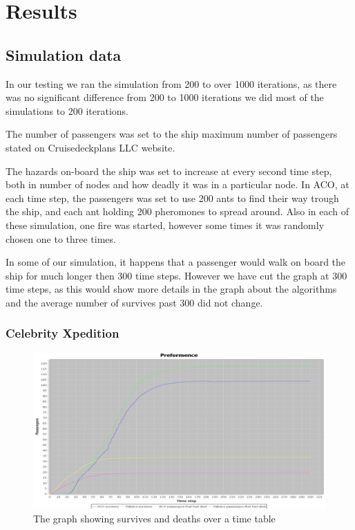 \chapter{Results}
\label{ch:testing}

\section{Simulation data}
In our testing we ran the simulation from 200 to over 1000 iterations, as there was no significant difference from 200 to 1000 iterations we did most of the simulations to 200 iterations.

The number of passengers was set to the ship maximum number of passengers stated on Cruisedeckplans LLC\cite{cruseships} website.

The hazards on-board the ship was set to increase at every second time step, both in number of nodes and how deadly it was in a particular node. In ACO, at each time step, the passengers was set to use 200 ants to find their way trough the ship, and each ant holding 200 pheromones to spread around. Also in each of these simulation, one fire was started, however some times it was randomly chosen one to three times.

In some of our simulation, it happens that a passenger would walk on board the ship for much longer then 300 time steps. However we have cut the graph at 300 time steps, as this would show more details in the graph about the algorithms and the average number of survives past 300 did not change.


\subsection{Celebrity Xpedition}

\begin{figure} [h]
\centering
\hspace*{-1.0in}
\includegraphics[scale=0.35]{images/Graph-using-200-rounds-140-passangers-and-shortest-first-one-hazzard.png}
\caption{The graph showing survives and deaths over a time table}
\label{fig:celebShortest}
\end{figure}

